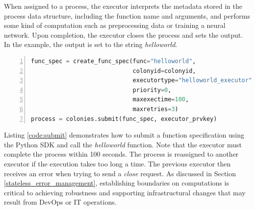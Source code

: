 \documentclass{article}
\begin{document}
When assigned to a process, the executor interprets the metadata stored in the process data structure, including the function name and arguments, and performs some kind of computation such as preprocessing data or training a neural network. Upon completion, the executor closes the process and sets the output. In the example, the output is set to the string \emph{helloworld}.

\begin{lstlisting}[showstringspaces=false, frame=lines, numbers=left, numberstyle=\scriptsize, backgroundcolor=\color{background}, basicstyle=\small, language=Python, label=code:submit, caption=Submitting a function specification.]
func_spec = create_func_spec(func="helloworld",
                             colonyid=colonyid,
                             executortype="helloworld_executor",
                             priority=0,
                             maxexectime=100,
                             maxretries=3)
process = colonies.submit(func_spec, executor_prvkey)
\end{lstlisting}

Listing \ref{code:submit} demonstrates how to submit a function specification using the Python SDK and call the \emph{helloworld} function. Note that the executor must complete the process within 100 seconds. The process is reassigned to another executor if the execution takes too long a time. The previous executor then receives an error when trying to send a \emph{close} request. As discussed in Section \ref{stateless_error_management}, establishing boundaries on computations is critical to achieving robustness and supporting infrastructural changes that may result from DevOps or IT operations.
\end{document}
